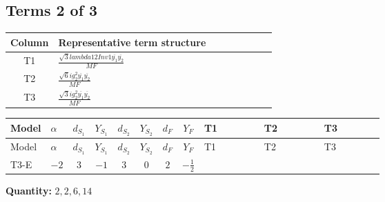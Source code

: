 \documentclass[8pt]{article}
\begin{document}
\begin{landscape}
\subsection*{Terms 2 of 3}
\begin{center}
\begin{tabular}{@{}c >{\raggedright\arraybackslash}p{0.82\linewidth}@{}}
\toprule
Column & Representative term structure \\
\midrule
T1 & \(\displaystyle \frac{\sqrt{3} lambda12Inv1 \overline{y_{1}} \overline{y_{2}}}{MF}\) \\
\midrule
T2 & \(\displaystyle \frac{\sqrt{6} i g_{2}^{2} \overline{y_{1}} \overline{y_{2}}}{MF}\) \\
\midrule
T3 & \(\displaystyle \frac{\sqrt{3} i g_{2}^{2} \overline{y_{1}} \overline{y_{2}}}{MF}\) \\
\midrule
\bottomrule
\end{tabular}
\end{center}
\smallskip
\tiny
\begin{longtable}{@{}llcccccc >{\raggedright\arraybackslash}p{0.21\linewidth} >{\raggedright\arraybackslash}p{0.21\linewidth} >{\raggedright\arraybackslash}p{0.21\linewidth}@{}}
\toprule
Model & $\alpha$ & $d_{S_1}$ & $Y_{S_1}$ & $d_{S_2}$ & $Y_{S_2}$ & $d_F$ & $Y_F$ & T1 & T2 & T3 \\
\midrule
\endfirsthead
\toprule
Model & $\alpha$ & $d_{S_1}$ & $Y_{S_1}$ & $d_{S_2}$ & $Y_{S_2}$ & $d_F$ & $Y_F$ & T1 & T2 & T3 \\
\midrule
\endhead
T3-E & $-2$ & $3$ & $-1$ & $3$ & $0$ & $2$ & $-\frac{1}{2}$ & \scriptsize\adjustbox{max width=\linewidth}{$\begin{gathered} \frac{\sqrt{3} lambda12Inv1 \overline{y_{1}} \overline{y_{2}}}{6 MF}\end{gathered}$} & \scriptsize\adjustbox{max width=\linewidth}{$\begin{gathered} \frac{\sqrt{6} i g_{2}^{2} \overline{y_{1}} \overline{y_{2}}}{3 MF}\end{gathered}$} & \scriptsize\adjustbox{max width=\linewidth}{$\begin{gathered} \frac{\sqrt{3} i g_{2}^{2} \overline{y_{1}} \overline{y_{2}}}{6 MF}\end{gathered}$} \\
\midrule
\bottomrule
\end{longtable}
\clearpage
\noindent\textbf{Quantity: }$\mathrm{2,2,6,14}$\par\smallskip

\end{landscape}
\end{document}
